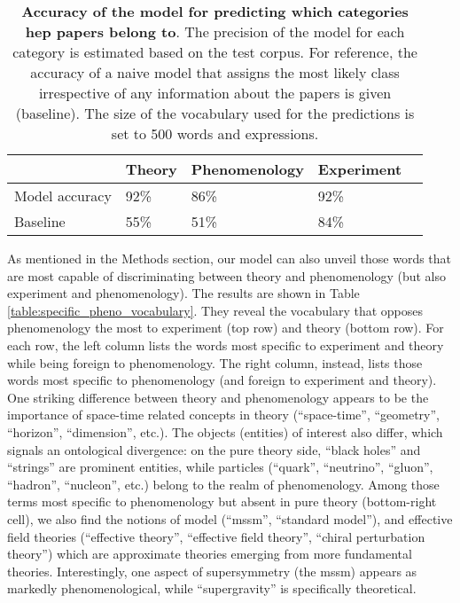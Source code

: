 \documentclass[smallextended]{svjour3}
\begin{document}
\begin{table}[h]
\centering
\begin{tabular}{@{}lllll@{}}
\toprule
               & Theory & Phenomenology & Experiment &  \\ \midrule
Model accuracy & 92\%   & 86\%          & 92\%       &  \\
Baseline       & 55\%   & 51\%          & 84\%       &  \\ \bottomrule
\end{tabular}
\caption{\textbf{Accuracy of the model for predicting which categories \gls{hep} papers belong to}. The precision of the model for each category is estimated based on the test corpus. For reference, the accuracy of a naive model that assigns the most likely class irrespective of any information about the papers is given (baseline). The size of the vocabulary used for the predictions is set to 500 words and expressions. }
    \label{table:categories_bow_prediction}
\end{table}

As mentioned in the Methods section, our model can also unveil those words that are most capable of discriminating between theory and phenomenology (but also experiment and phenomenology). The results are shown in Table \ref{table:specific_pheno_vocabulary}. They reveal the vocabulary that opposes phenomenology the most to experiment (top row) and theory (bottom row). For each row, the left column lists the words most specific to experiment and theory while being foreign to phenomenology. The right column, instead, lists those words most specific to phenomenology (and foreign to experiment and theory). One striking difference between theory and phenomenology appears to be the importance of space-time related concepts in theory (``space-time'', ``geometry'',  ``horizon'', ``dimension'', etc.). The objects (entities) of interest also differ, which signals an ontological divergence: on the pure theory side, ``black holes'' and ``strings'' are prominent entities, while particles (``quark'', ``neutrino'', ``gluon'', ``hadron'', ``nucleon'', etc.) belong to the realm of phenomenology. Among those terms most specific to phenomenology but absent in pure theory (bottom-right cell), we also  find the notions of model (``mssm'', ``standard model''), and effective field theories (``effective theory'', ``effective field theory'', ``chiral perturbation theory'') which are approximate theories emerging from more fundamental theories. Interestingly, one aspect of supersymmetry (the \gls{mssm}) appears as markedly phenomenological, while ``supergravity'' is specifically theoretical.
\end{document}
